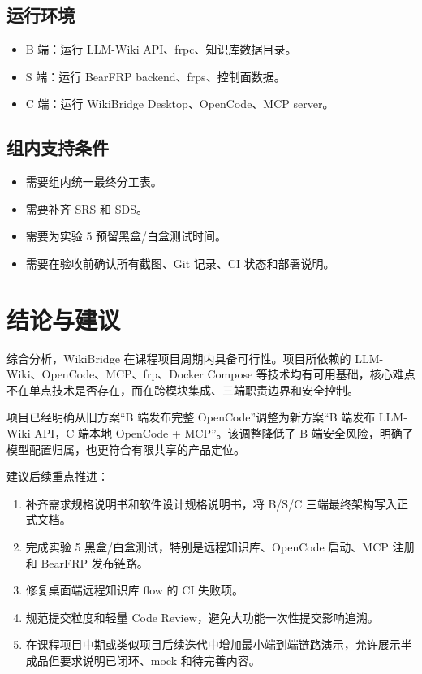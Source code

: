 \documentclass[UTF8,a4paper,12pt,fontset=fandol]{ctexart}
\begin{document}
\subsection{运行环境}
\begin{itemize}
  \item B 端：运行 LLM-Wiki API、frpc、知识库数据目录。
  \item S 端：运行 BearFRP backend、frps、控制面数据。
  \item C 端：运行 WikiBridge Desktop、OpenCode、MCP server。
\end{itemize}

\subsection{组内支持条件}
\begin{itemize}
  \item 需要组内统一最终分工表。
  \item 需要补齐 SRS 和 SDS。
  \item 需要为实验 5 预留黑盒/白盒测试时间。
  \item 需要在验收前确认所有截图、Git 记录、CI 状态和部署说明。
\end{itemize}

\section{结论与建议}
综合分析，WikiBridge 在课程项目周期内具备可行性。项目所依赖的 LLM-Wiki、OpenCode、MCP、frp、Docker Compose 等技术均有可用基础，核心难点不在单点技术是否存在，而在跨模块集成、三端职责边界和安全控制。

项目已经明确从旧方案“B 端发布完整 OpenCode”调整为新方案“B 端发布 LLM-Wiki API，C 端本地 OpenCode + MCP”。该调整降低了 B 端安全风险，明确了模型配置归属，也更符合有限共享的产品定位。

建议后续重点推进：
\begin{enumerate}
  \item 补齐需求规格说明书和软件设计规格说明书，将 B/S/C 三端最终架构写入正式文档。
  \item 完成实验 5 黑盒/白盒测试，特别是远程知识库、OpenCode 启动、MCP 注册和 BearFRP 发布链路。
  \item 修复桌面端远程知识库 flow 的 CI 失败项。
  \item 规范提交粒度和轻量 Code Review，避免大功能一次性提交影响追溯。
  \item 在课程项目中期或类似项目后续迭代中增加最小端到端链路演示，允许展示半成品但要求说明已闭环、mock 和待完善内容。
\end{enumerate}
\end{document}

